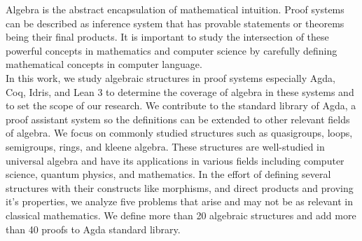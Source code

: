 Algebra is the abstract encapsulation of mathematical intuition. Proof systems
can be described as inference system that has provable statements or theorems
being their final products. It is important to study the intersection of these
powerful concepts in mathematics and computer science by carefully defining
mathematical concepts in computer language.\\

In this work, we study algebraic structures in proof systems especially Agda,
Coq, Idris, and Lean 3 to determine the coverage of algebra in these systems and
to set the scope of our research. We contribute to the standard library of Agda,
a proof assistant system so the definitions can be extended to other relevant
fields of algebra. We focus on commonly studied structures such as quasigroups,
loops, semigroups, rings, and kleene algebra. These structures are well-studied
in universal algebra and have its applications in various fields including
computer science, quantum physics, and mathematics. In the effort of defining
several structures with their constructs like morphisms, and direct products and
proving it's properties, we analyze five problems that arise and may not be as
relevant in classical mathematics. We define more than 20 algebraic structures
and add more than 40 proofs to Agda standard library.